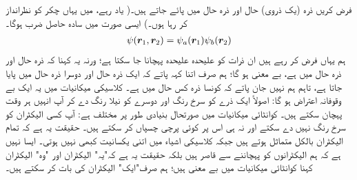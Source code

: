 فرض کریں ذرہ   (یک ذروی)  حال   اور ذرہ    حال  میں پائے جاتے ہیں۔( یاد رہے،   میں یہاں چکر کو نظرانداز کر رہا ہوں۔)  ایسی صورت میں  سادہ حاصل ضرب ہوگا۔
\begin{align}
	\psi({{\boldsymbol{r}}}_1, {{\boldsymbol{r}}}_2)=\psi_a({{\boldsymbol{r}}}_1)\psi_b({{\boldsymbol{r}}}_2)
\end{align}
 ہم یہاں  فرض کر رہے ہیں  ان ذرات کو علیحدہ علیحدہ پہچانا جا  سکتا ہے؛  ورنہ یہ کہنا کہ ذرہ  حال   اور ذرہ  حال  میں ہے،  بے معنی ہو  گا؛   ہم  صرف اتنا کہہ پاتے کہ ایک ذرہ  حال   اور دوسرا ذرہ  حال  میں پایا جاتا ہے، تاہم ہم نہیں جان پاتے کہ کونسا ذرہ کس حال میں ہے۔ کلاسیکی میکانیات میں یہ ایک بے وقوفانہ  اعتراض ہو گا: اصولاً ایک ذرے کو سرخ رنگ اور دوسرے کو نیلا رنگ دے کر آپ انہیں ہر وقت پہچان سکتے ہیں۔ کوانٹائی میکانیات میں صورتحال بنیادی طور پر مختلف ہے:  آپ کسی الیکٹران کو سرخ رنگ نہیں دے سکتے  اور نہ ہی اس پر کوئی پرچی چسپاں کر سکتے ہیں۔ حقیقت یہ ہے کہ تمام الیکٹران بالکل متماثل ہوتے ہیں جبکہ کلاسیکی اشیاء میں اتنی یکسانیت کبھی نہیں ہوتی۔ ایسا نہیں ہے کہ ہم الیکٹرانوں کو پہچاننے سے قاصر ہیں بلکہ حقیقت یہ ہے کہ"یہ" الیکٹران اور "وہ"   الیکٹران   کہنا کوانٹائی میکانیات میں بے معنی ہیں؛   ہم صرف"ایک" الیکٹران کی بات کر سکتے ہیں۔
 
